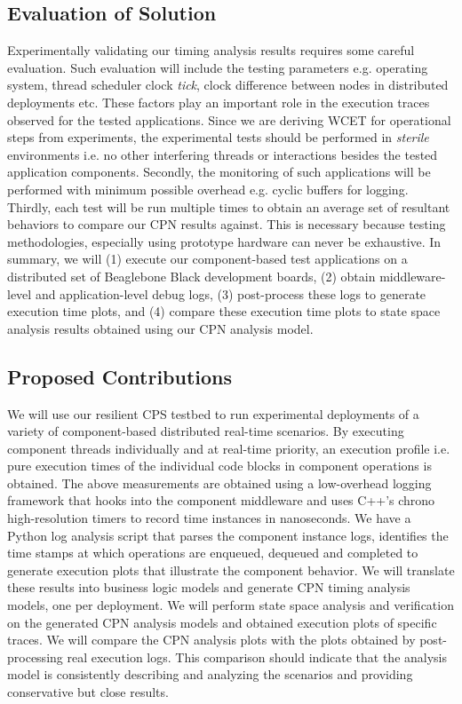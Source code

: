 \subsection{Evaluation of Solution}
Experimentally validating our timing analysis results requires some careful evaluation. Such evaluation will include the testing parameters e.g. operating system, thread scheduler clock \emph{tick}, clock difference between nodes in distributed deployments etc. These factors play an important role in the execution traces observed for the tested applications. Since we are deriving WCET for operational steps from experiments, the experimental tests should be performed in \emph{sterile} environments i.e. no other interfering threads or interactions besides the tested application components. Secondly, the monitoring of such applications will be performed with minimum possible overhead e.g. cyclic buffers for logging. Thirdly, each test will be run multiple times to obtain an average set of resultant behaviors to compare our CPN results against. This is necessary because testing methodologies, especially using prototype hardware can never be exhaustive. In summary, we will (1) execute our component-based test applications on a  distributed set of Beaglebone Black development boards, (2) obtain middleware-level and application-level debug logs, (3) post-process these logs to generate execution time plots, and (4) compare these execution time plots to state space analysis results obtained using our CPN analysis model.

\subsection{Proposed Contributions}
We will use our resilient CPS testbed to run experimental deployments of a variety of component-based distributed real-time scenarios. By executing component threads individually and at real-time priority, an execution profile i.e. pure execution times of the individual code blocks in component operations is obtained. The above measurements are obtained using a low-overhead logging framework that hooks into the component middleware and uses C++'s chrono high-resolution timers to record time instances in nanoseconds. We have a Python log analysis script that parses the component instance logs, identifies the time stamps at which operations are enqueued, dequeued and completed to generate execution plots that illustrate the component behavior. We will translate these results into business logic models and generate CPN timing analysis models, one per deployment. We will perform state space analysis and verification on the generated CPN analysis models and obtained execution plots of specific traces. We will compare the CPN analysis plots with the plots obtained by post-processing real execution logs. This comparison should indicate that the analysis model is consistently describing and analyzing the scenarios and providing conservative but close results.

